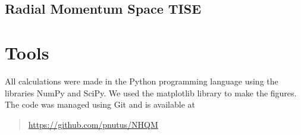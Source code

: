 \documentclass[12pt,a4paper]{report}
\begin{document}
\section{Radial Momentum Space TISE}
\label{sec:radial mom space TISE}



\chapter{Tools}

All calculations were made in the Python programming language 
using the libraries NumPy and SciPy. We used the matplotlib 
library to make the figures. The code was managed using Git 
and is available at
\begin{quote}
  \url{https://github.com/pnutus/NHQM}
\end{quote}


{}
\end{document}
